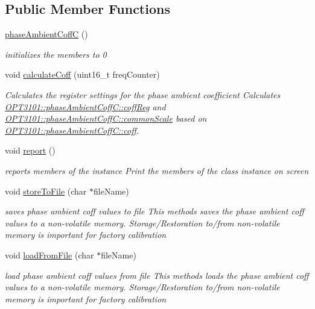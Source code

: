 \subsection*{Public Member Functions}
\begin{DoxyCompactItemize}
\item 
\mbox{\hyperlink{class_o_p_t3101_1_1phase_ambient_coff_c_aa32106a402df3ed93a73203634017953}{phase\+Ambient\+CoffC}} ()
\begin{DoxyCompactList}\small\item\em initializes the members to 0 \end{DoxyCompactList}\item 
void \mbox{\hyperlink{class_o_p_t3101_1_1phase_ambient_coff_c_ac8f4dfff191b0adc7be044f39500e242}{calculate\+Coff}} (uint16\+\_\+t freq\+Counter)
\begin{DoxyCompactList}\small\item\em Calculates the register settings for the phase ambient coefficient Calculates \mbox{\hyperlink{class_o_p_t3101_1_1phase_ambient_coff_c_a267c8f925dedeb8af97aba7ffae95da4}{O\+P\+T3101\+::phase\+Ambient\+Coff\+C\+::coff\+Reg}} and \mbox{\hyperlink{class_o_p_t3101_1_1phase_ambient_coff_c_abed8ff9971976201638badbda9fd4543}{O\+P\+T3101\+::phase\+Ambient\+Coff\+C\+::common\+Scale}} based on \mbox{\hyperlink{class_o_p_t3101_1_1phase_ambient_coff_c_af655f6704c4b3901b82a913f8a047258}{O\+P\+T3101\+::phase\+Ambient\+Coff\+C\+::coff}}. \end{DoxyCompactList}\item 
void \mbox{\hyperlink{class_o_p_t3101_1_1phase_ambient_coff_c_afba22e085a341c2d9b1add1532ea06a1}{report}} ()
\begin{DoxyCompactList}\small\item\em reports members of the instance Print the members of the class instance on screen \end{DoxyCompactList}\item 
void \mbox{\hyperlink{class_o_p_t3101_1_1phase_ambient_coff_c_ad5b439c7ab384c03fa540d2bc06c3352}{store\+To\+File}} (char $\ast$file\+Name)
\begin{DoxyCompactList}\small\item\em saves phase ambient coff values to file This methods saves the phase ambient coff values to a non-\/volatile memory. Storage/\+Restoration to/from non-\/volatile memory is important for factory calibration \end{DoxyCompactList}\item 
void \mbox{\hyperlink{class_o_p_t3101_1_1phase_ambient_coff_c_a41db9882facdbf3b437dcb54958b5763}{load\+From\+File}} (char $\ast$file\+Name)
\begin{DoxyCompactList}\small\item\em load phase ambient coff values from file This methods loads the phase ambient coff values to a non-\/volatile memory. Storage/\+Restoration to/from non-\/volatile memory is important for factory calibration \end{DoxyCompactList}\end{DoxyCompactItemize}
